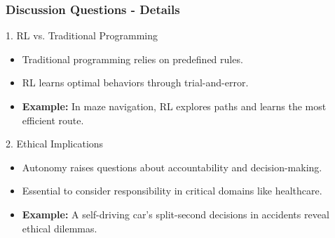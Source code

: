 \documentclass[aspectratio=169]{beamer}
\begin{document}
\begin{frame}[fragile]
    \frametitle{Discussion Questions - Details}
    
    \begin{block}{1. RL vs. Traditional Programming}
        \begin{itemize}
            \item Traditional programming relies on predefined rules.
            \item RL learns optimal behaviors through trial-and-error.
            \item \textbf{Example:} In maze navigation, RL explores paths and learns the most efficient route.
        \end{itemize}
    \end{block}
    
    \begin{block}{2. Ethical Implications}
        \begin{itemize}
            \item Autonomy raises questions about accountability and decision-making.
            \item Essential to consider responsibility in critical domains like healthcare.
            \item \textbf{Example:} A self-driving car's split-second decisions in accidents reveal ethical dilemmas.
        \end{itemize}
    \end{block}
\end{frame}
\end{document}
